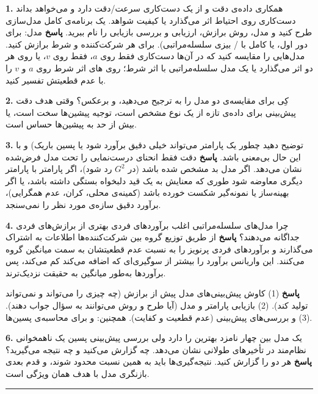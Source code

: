 \textbf{1.} همکاری داده‌ی دقت و  از یک دست‌کاری سرعت/دقت دارد و
می‌خواهد بداند دست‌کاری روی احتیاط اثر می‌گذارد یا کیفیت شواهد. یک برنامه‌ی
کامل مدل‌سازی طرح کنید و مدل، روش برازش، ارزیابی و بررسی بازیابی را نام
ببرید. \textbf{پاسخ} مدل:  برای دور
اول، یا  کامل با  / بیزی سلسله‌مراتبی). برای هر شرکت‌کننده
و شرط برازش کنید. مدل‌هایی را مقایسه کنید که در آن‌ها دست‌کاری فقط روی
\(a\)، فقط روی \(v\)، یا روی هر دو اثر می‌گذارد  یا یک مدل
سلسله‌مراتبی با اثر شرط؛  روی های  اثر شرط
روی \(a\) و \(v\) را با عدم قطعیتش تفسیر کنید.

\textbf{2.} کِی برای مقایسه‌ی دو مدل  را به
 ترجیح می‌دهید، و برعکس؟  وقتی هدف دقت
پیش‌بینی برای داده‌ی تازه از یک نوع مشخص است، توجیه پیشین‌ها سخت است، یا
 بیش از حد به پیشین‌ها حساس است.

\textbf{3.} توضیح دهید چطور یک پارامتر می‌تواند خیلی دقیق برآورد شود
 یا پسین باریک) و با این حال بی‌معنی باشد. \textbf{پاسخ} دقت فقط
انحنای درست‌نمایی را تحت مدل فرض‌شده نشان می‌دهد. اگر مدل بد مشخص شده باشد
(در \(G^2\) رد شود)، اگر پارامتر با پارامتر دیگری معاوضه شود
طوری که معنایش به یک قید دلبخواه بستگی داشته باشد، یا اگر بهینه‌ساز یا
نمونه‌گیر شکست خورده باشد (کمینه‌ی محلی، کران، عدم همگرایی)، برآورد دقیق
سازه‌ی مورد نظر را نمی‌سنجد.

\textbf{4.} چرا مدل‌های سلسله‌مراتبی اغلب برآوردهای فردی بهتری از برازش‌های
فردی جداگانه می‌دهند؟ \textbf{پاسخ} از طریق توزیع گروه بین شرکت‌کننده‌ها
اطلاعات به اشتراک می‌گذارند و برآوردهای فردی پرنویز را به نسبت عدم
قطعیتشان به سمت میانگین گروه  می‌کنند. این واریانس برآورد را
بیشتر از سوگیری‌ای که اضافه می‌کند کم می‌کند، پس برآوردها به‌طور میانگین به
حقیقت نزدیک‌ترند.

\textbf{پاسخ} (1) کاوش پیش‌بینی‌های مدل پیش از برازش (چه چیزی را می‌تواند و
نمی‌تواند تولید کند). (2) بازیابی پارامتر و مدل (آیا طرح و روش می‌توانند
به سؤال جواب دهند). (3)  و بررسی‌های پیش‌بینی (عدم قطعیت و
کفایت). همچنین:  و  برای محاسبه‌ی پسین‌ها.

\textbf{6.} یک مدل بین چهار نامزد بهترین  را دارد ولی بررسی
پیش‌بینی پسین یک ناهمخوانی نظام‌مند در تأخیرهای طولانی نشان می‌دهد. چه
گزارش می‌کنید و چه نتیجه می‌گیرید؟ \textbf{پاسخ} هر دو را گزارش کنید.
نتیجه‌گیری‌ها باید به همین نسبت محدود شوند، و قدم بعدی بازنگری مدل با هدف
همان ویژگی است.

\begin{center}\rule{0.5\linewidth}{0.5pt}\end{center}

